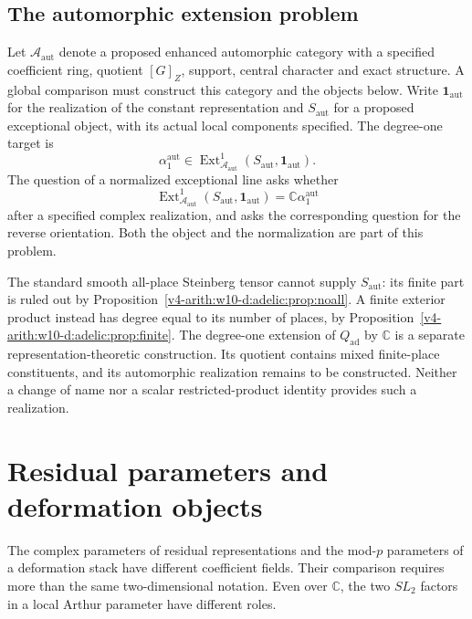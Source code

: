 \subsection{The automorphic extension problem}
\label{v4-arith:w10-d:prop:adelic-ext1-line}
Let $\mathcal A_{\mathrm{aut}}$ denote a proposed enhanced automorphic
category with a specified coefficient ring, quotient $[G]_Z$, support,
central character and exact structure. A global comparison must
construct this category and the objects below. Write $\mathbf1_{\mathrm{aut}}$
for the realization of the constant representation and $S_{\mathrm{aut}}$
for a proposed exceptional object, with its actual local components
specified. The degree-one target is
\begin{equation}\label{v4-arith:w10-d:eq:aut-ext1-global}
 \alpha^{\mathrm{aut}}_1\in
 \operatorname{Ext}^1_{\mathcal A_{\mathrm{aut}}}
                 (S_{\mathrm{aut}},\mathbf1_{\mathrm{aut}}).
\end{equation}
The question of a normalized exceptional line asks whether
\begin{equation}\label{v4-arith:w10-d:eq:adelic-ext1-line}
 \operatorname{Ext}^1_{\mathcal A_{\mathrm{aut}}}
                 (S_{\mathrm{aut}},\mathbf1_{\mathrm{aut}})
        =\mathbb C\alpha^{\mathrm{aut}}_1
\end{equation}
after a specified complex realization, and asks the corresponding
question for the reverse orientation. Both the object and the
normalization are part of this problem.

The standard smooth all-place Steinberg tensor cannot supply
$S_{\mathrm{aut}}$: its finite part is ruled out by
Proposition~\ref{v4-arith:w10-d:adelic:prop:noall}.
A finite exterior product instead has degree equal to its number of
places, by Proposition~\ref{v4-arith:w10-d:adelic:prop:finite}.
The degree-one extension of $Q_{\mathrm{ad}}$ by $\mathbb C$ is a
separate representation-theoretic construction. Its quotient contains
mixed finite-place constituents, and its automorphic realization
remains to be constructed. Neither a change of name nor a scalar
restricted-product identity provides such a realization.

\section{Residual parameters and deformation objects}
\label{v4-arith:w10-d:X2}

The complex parameters of residual representations and the mod-$p$
parameters of a deformation stack have different coefficient fields.
Their comparison requires more than the same two-dimensional notation.
Even over $\mathbb C$, the two $SL_2$ factors in a local Arthur parameter
have different roles.

